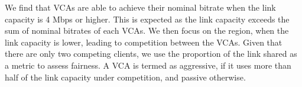 We find that VCAs are able to achieve their nominal bitrate when the link capacity is 4 Mbps or higher. This is expected as the link capacity exceeds the sum of nominal bitrates of each VCAs. We then focus on the region, when the link capacity is lower, leading to competition between the VCAs. Given that there are only two competing clients, we use the proportion of the link shared as a metric to assess fairness. A VCA is termed as aggressive, if it uses more than half of the link capacity under competition, and passive otherwise.

